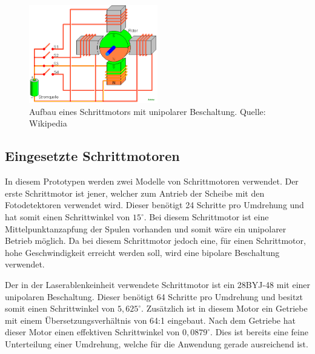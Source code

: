 \begin{figure} \centering
	\includegraphics[width=0.5\textwidth]{img/Wikipedia/SchrittmotorUnipolar.PNG}
	\caption{Aufbau eines Schrittmotors mit unipolarer Beschaltung. Quelle: Wikipedia \cite{web:schrittmotor}}
	\label{img:stepper}
\end{figure}


\subsection{Eingesetzte Schrittmotoren}
In diesem Prototypen werden zwei Modelle von Schrittmotoren verwendet.
Der erste Schrittmotor ist jener, welcher zum Antrieb der Scheibe mit den Fotodetektoren verwendet wird.
Dieser benötigt 24 Schritte pro Umdrehung und hat somit einen Schrittwinkel von $15^\circ$.
Bei diesem Schrittmotor ist eine Mittelpunktanzapfung der Spulen vorhanden und somit wäre ein unipolarer Betrieb möglich.
Da bei diesem Schrittmotor jedoch eine, für einen Schrittmotor, hohe Geschwindigkeit erreicht werden soll, wird eine bipolare Beschaltung verwendet.

Der in der Laserablenkeinheit verwendete Schrittmotor ist ein 28BYJ-48 mit einer unipolaren Beschaltung.
Dieser benötigt 64 Schritte pro Umdrehung und besitzt somit einen Schrittwinkel von $5,625^\circ$.
Zusätzlich ist in diesem Motor ein Getriebe mit einem Übersetzungsverhältnis von 64:1 eingebaut.
Nach dem Getriebe hat dieser Motor einen effektiven Schrittwinkel von $0,0879^\circ$.
Dies ist bereits eine feine Unterteilung einer Umdrehung, welche für die Anwendung gerade ausreichend ist.

